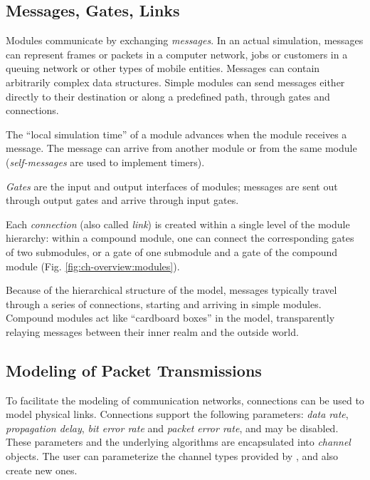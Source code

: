 \subsection{Messages, Gates, Links}
\label{sec:overview:messages-gates-links}

Modules communicate by exchanging
\textit{messages}. In an actual simulation,
messages can represent frames or packets in a computer network, jobs
or customers in a queuing network or other types of mobile entities.
Messages can contain arbitrarily complex data structures. Simple
modules can send messages either directly to their destination or
along a predefined path, through gates and connections.


The ``local simulation time'' of a module advances when the module
receives a message. The message can arrive from another module
or from the same module (\textit{self-messages} are used to implement
timers).


\textit{Gates} are the input and output interfaces of
modules; messages are sent out through output gates and arrive through
input gates.

Each \textit{connection} (also called
\textit{link}) is created within a single level of the
module hierarchy: within a compound module, one can connect the
corresponding gates of two submodules, or a gate of one submodule and
a gate of the compound module (Fig.
\ref{fig:ch-overview:modules}).

Because of the hierarchical structure of the model, messages typically
travel through a series of connections, starting and arriving in simple
modules. Compound modules act like ``cardboard boxes'' in the model,
transparently relaying messages between their inner realm and the
outside world.


\subsection{Modeling of Packet Transmissions}
\label{sec:overview:modeling-of-packet-transmissions}

To facilitate the modeling of communication networks, connections
can be used to model physical links. Connections support
the following parameters: \textit{data rate}, \textit{propagation delay},
\textit{bit error rate} and \textit{packet error rate}, and may be
disabled. These parameters and the underlying algorithms are encapsulated
into \textit{channel} objects. The user can parameterize the channel
types provided by {\opp}, and also create new ones.

